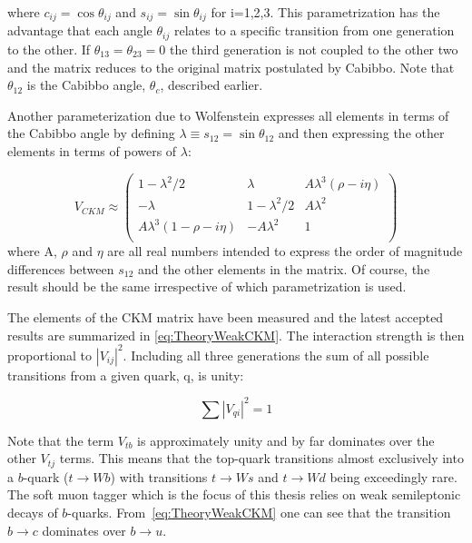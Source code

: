 where $c_{ij}=\cos\theta_{ij}$ and $s_{ij}=\sin\theta_{ij}$ for i=1,2,3. This parametrization has the advantage that each angle $\theta_{ij}$ relates to a specific transition from one generation to the other. If $\theta_{13} = \theta_{23} = 0$ the third generation is not coupled to the other two and the matrix reduces to the original matrix postulated by Cabibbo. Note that $\theta_{12}$ is the Cabibbo angle, $\theta_c$, described earlier.

Another parameterization due to Wolfenstein \cite{Theory:CKMWolfenstein} expresses all elements in terms of the Cabibbo angle by defining $\lambda\equiv s_{12}=\sin \theta_{12}$ and then expressing the other elements in terms of powers of $\lambda$:

\begin{equation}
\label{eq:TheoryWeakCKMWolfenstein}
V_{CKM}
\approx
\begin{pmatrix}
1-\lambda^2/2 & \lambda & A\lambda^3(\rho-i\eta) \\
-\lambda & 1-\lambda^2/2 & A\lambda^2 \\ 
A\lambda^3(1-\rho-i\eta) & -A\lambda^2 & 1\\
\end{pmatrix}
\end{equation}
%
where A, $\rho$ and $\eta$ are all real numbers intended to express the order of magnitude differences between $s_{12}$ and the other elements in the matrix. Of course, the result should be the same irrespective of which parametrization is used.

The elements of the CKM matrix have been measured and the latest accepted results are summarized in \ref{eq:TheoryWeakCKM}\cite{Theory:PDGBooklet}. The interaction strength is then proportional to $|V_{ij}|^{2}$. Including all three generations the sum of all possible transitions from a given quark, q, is unity:

\begin{equation} 
\label{eq:TheoryWeakMixingTotal}
\sum|V_{qi}|^{2}=1
\end{equation}

Note that the term $V_{tb}$ is approximately unity and by far dominates over the other $V_{tj}$ terms. This means that the top-quark transitions almost exclusively into a $b$-quark ($t\rightarrow Wb$) with transitions $t\rightarrow Ws$ and $t\rightarrow Wd$ being exceedingly rare. The soft muon tagger which is the focus of this thesis relies on weak semileptonic decays of $b$-quarks. From~\ref{eq:TheoryWeakCKM} one can see that the transition $b\rightarrow c$ dominates over $b\rightarrow u$.

